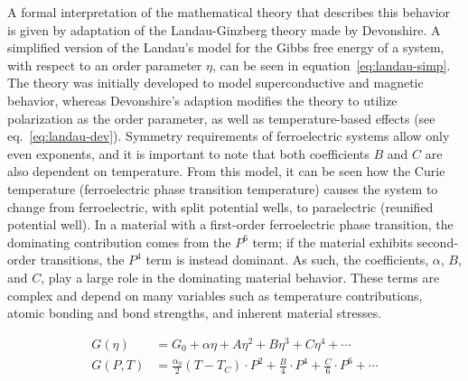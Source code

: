 A formal interpretation of the mathematical theory that describes this behavior is given by adaptation of the Landau-Ginzberg theory made by Devonshire.\cite{landau-devon_physics_2007,ricinschi_landau_1999} A simplified version of the Landau's model for the Gibbs free energy of a system, with respect to an order parameter $\eta$, can be seen in equation~\vref{eq:landau-simp}.\cite{landau_1937} The theory was initially developed to model superconductive and magnetic behavior,\cite{ginzburg_superconductivity_2004} whereas Devonshire's adaption modifies the theory to utilize polarization as the order parameter, as well as temperature-based effects (see eq.~\vref{eq:landau-dev}).\cite{landau-devon_physics_2007,ricinschi_landau_1999} Symmetry requirements of ferroelectric systems allow only even exponents, and it is important to note that both coefficients $B$ and $C$ are also dependent on temperature. From this model, it can be seen how the Curie temperature (ferroelectric phase transition temperature) causes the system to change from ferroelectric, with split potential wells, to paraelectric (reunified potential well). In a material with a first-order ferroelectric phase transition, the dominating contribution comes from the $P^{6}$ term; if the material exhibits second-order transitions, the $P^{4}$ term is instead dominant. As such, the coefficients, $\alpha$, $B$, and $C$, play a large role in the dominating material behavior. These terms are complex and depend on many variables such as temperature contributions, atomic bonding and bond strengths, and inherent material stresses.  

\begin{subequations}
\label{eq:landau}
\begin{align}
	\label{eq:landau-simp}G (\eta)&= G_{0}+\alpha \eta +A\eta^{2}+B\eta^{3}+C\eta^{4}+\cdots%
	\\
        	\label{eq:landau-dev}G(P,T) &= \frac{\alpha_{0}}{2}\left(T-T_{C}\right)\cdot P^{2}+\frac{B}{4}\cdot P^{4}+\frac{C}{6}\cdot P^{6}+\cdots
\end{align}
\end{subequations}


